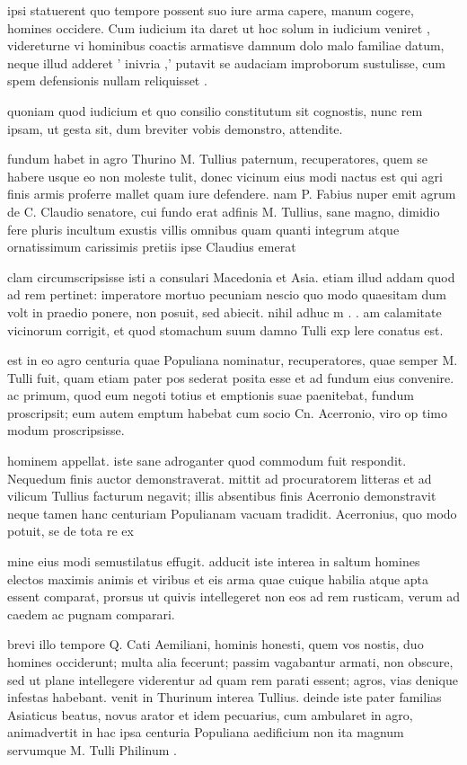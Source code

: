  ipsi statuerent quo tempore possent suo iure arma capere, manum cogere, homines occidere. Cum iudicium ita daret ut hoc solum in iudicium veniret , videreturne vi hominibus coactis armatisve damnum dolo malo familiae datum, neque illud adderet ' inivria ,' putavit se audaciam improborum sustulisse, cum spem defensionis nullam reliquisset .

 quoniam quod iudicium et quo consilio constitutum sit cognostis, nunc rem ipsam, ut gesta sit, dum breviter vobis demonstro, attendite.

 fundum habet in agro Thurino M. Tullius paternum, recuperatores, quem se habere usque eo non moleste tulit, donec vicinum eius modi nactus est qui agri finis armis proferre mallet quam iure defendere. nam P. Fabius nuper emit agrum de C. Claudio senatore, cui fundo erat adfinis M. Tullius, sane magno, dimidio fere pluris incultum exustis villis omnibus quam quanti integrum atque ornatissimum carissimis pretiis ipse Claudius emerat

 clam circumscripsisse isti a consulari Macedonia et Asia. etiam illud addam quod ad rem pertinet: imperatore mortuo pecuniam nescio quo modo quaesitam dum volt in praedio ponere, non posuit, sed abiecit. nihil adhuc m . . am calamitate vicinorum corrigit, et quod stomachum suum damno Tulli exp lere conatus est.

 est in eo agro centuria quae Populiana nominatur, recuperatores, quae semper M. Tulli fuit, quam etiam pater pos sederat posita esse et ad fundum eius convenire. ac primum, quod eum negoti totius et emptionis suae paenitebat, fundum proscripsit; eum autem emptum habebat cum socio Cn. Acerronio, viro op timo modum proscripsisse.

 hominem appellat. iste sane adroganter quod commodum fuit respondit. Nequedum finis auctor demonstraverat. mittit ad procuratorem litteras et ad vilicum Tullius facturum negavit; illis absentibus finis Acerronio demonstravit neque tamen hanc centuriam Populianam vacuam tradidit. Acerronius, quo modo potuit, se de tota re ex

 mine eius modi semustilatus effugit. adducit iste interea in saltum homines electos maximis animis et viribus et eis arma quae cuique habilia atque apta essent comparat, prorsus ut quivis intellegeret non eos ad rem rusticam, verum ad caedem ac pugnam comparari.

 brevi illo tempore Q. Cati Aemiliani, hominis honesti, quem vos nostis, duo homines occiderunt; multa alia fecerunt; passim vagabantur armati, non obscure, sed ut plane intellegere viderentur ad quam rem parati essent; agros, vias denique infestas habebant. venit in Thurinum interea Tullius. deinde iste pater familias Asiaticus beatus, novus arator et idem pecuarius, cum ambularet in agro, animadvertit in hac ipsa centuria Populiana aedificium non ita magnum servumque M. Tulli Philinum .

